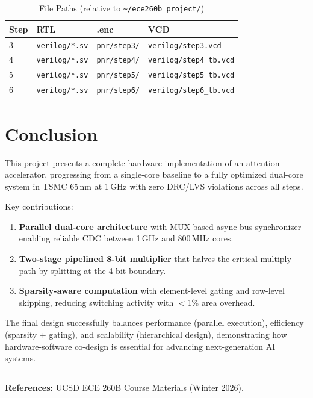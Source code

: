 \documentclass[10pt,twocolumn]{article}
\begin{document}
\vspace{-2pt}
\begin{table}[H]
\centering
\caption{File Paths (relative to
  \texttt{\small\textasciitilde/ece260b\_project/})}
\label{tab:deliverables}
\footnotesize
\begin{tabular}{llll}
\toprule
\textbf{Step} & \textbf{RTL} & \textbf{.enc} & \textbf{VCD} \\
\midrule
3 & \texttt{verilog/*.sv} & \texttt{pnr/step3/} &
  \texttt{verilog/step3.vcd} \\
4 & \texttt{verilog/*.sv} & \texttt{pnr/step4/} &
  \texttt{verilog/step4\_tb.vcd} \\
5 & \texttt{verilog/*.sv} & \texttt{pnr/step5/} &
  \texttt{verilog/step5\_tb.vcd} \\
6 & \texttt{verilog/*.sv} & \texttt{pnr/step6/} &
  \texttt{verilog/step6\_tb.vcd} \\
\bottomrule
\end{tabular}
\end{table}

\section{Conclusion}

This project presents a complete hardware implementation of an
attention accelerator, progressing from a single-core baseline to
a fully optimized dual-core system in TSMC 65\,nm at 1\,GHz with
zero DRC/LVS violations across all steps.

Key contributions:
\begin{enumerate}
  \item \textbf{Parallel dual-core architecture} with MUX-based
    async bus synchronizer enabling reliable CDC between 1\,GHz
    and 800\,MHz cores.
  \item \textbf{Two-stage pipelined 8-bit multiplier} that halves
    the critical multiply path by splitting at the 4-bit boundary.
  \item \textbf{Sparsity-aware computation} with element-level
    gating and row-level skipping, reducing switching activity with
    $<$1\% area overhead.
\end{enumerate}

The final design successfully balances performance (parallel
execution), efficiency (sparsity + gating), and scalability
(hierarchical design), demonstrating how hardware-software
co-design is essential for advancing next-generation AI systems.

\vspace{4pt}
\noindent\rule{\linewidth}{0.4pt}
{\footnotesize \textbf{References:}
UCSD ECE 260B Course Materials (Winter 2026).}
\end{document}

